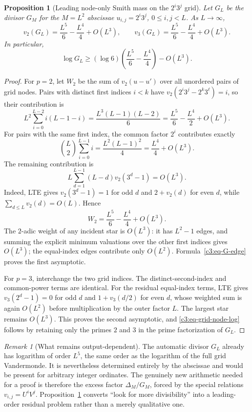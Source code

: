 \documentclass[11pt,oneside]{article}
\newtheorem{proposition}[theorem]{Proposition}
\theoremstyle{definition}
\theoremstyle{remark}
\newtheorem{remark}[theorem]{Remark}
\begin{document}
\begin{proposition}[Leading node-only Smith mass on the $2^i3^j$ grid]
\label{c3:prop-grid-node-mass}
Let $G_L$ be the divisor $G_M$ for the $M=L^2$ abscissae
$u_{i,j}=2^i3^j$, $0\le i,j<L$.  As $L\to\infty$,
\begin{equation}
 v_2(G_L)=\frac{L^5}{6}-\frac{L^4}{4}+O(L^3),
 \qquad
 v_3(G_L)=\frac{L^5}{6}-\frac{L^4}{4}+O(L^3).
 \label{c3:eq-grid-node-mass}
\end{equation}
In particular,
\begin{equation}
 \log G_L\ge
 (\log6)\left(\frac{L^5}{6}-\frac{L^4}{4}\right)-O(L^3).
 \label{c3:eq-grid-node-log}
\end{equation}
\end{proposition}

\begin{proof}
For $p=2$, let $W_2$ be the sum of $v_2(u-u')$ over all unordered pairs of grid nodes.
Pairs with distinct first indices $i<k$ have
$v_2(2^i3^j-2^k3^\ell)=i$, so their contribution is
\[
 L^2\sum_{i=0}^{L-2}i(L-1-i)
 =\frac{L^3(L-1)(L-2)}6
 =\frac{L^5}{6}-\frac{L^4}{2}+O(L^3).
\]
For pairs with the same first index, the common factor $2^i$ contributes exactly
\[
 \binom L2\sum_{i=0}^{L-1}i
 =\frac{L^2(L-1)^2}{4}
 =\frac{L^4}{4}+O(L^3).
\]
The remaining contribution is
\[
 L\sum_{d=1}^{L-1}(L-d)v_2(3^d-1)=O(L^3).
\]
Indeed, LTE gives $v_2(3^d-1)=1$ for odd $d$ and
$2+v_2(d)$ for even $d$, while
$\sum_{d\le L}v_2(d)=O(L)$.  Hence
\[
 W_2=\frac{L^5}{6}-\frac{L^4}{4}+O(L^3).
\]
The $2$-adic weight of any incident star is $O(L^3)$: it has $L^2-1$ edges, and summing the
explicit minimum valuations over the other first indices gives $O(L^3)$; the equal-index
edges contribute only $O(L^2)$.  Formula~\eqref{c3:eq-G-edge} proves the first asymptotic.

For $p=3$, interchange the two grid indices.  The distinct-second-index and common-power
terms are identical.  For the residual equal-index terms, LTE gives
$v_3(2^d-1)=0$ for odd $d$ and $1+v_3(d/2)$ for even $d$, whose weighted sum is again
$O(L^2)$ before multiplication by the outer factor $L$.  The largest star remains $O(L^3)$.
This proves the second asymptotic, and \eqref{c3:eq-grid-node-log} follows by retaining only
the primes $2$ and $3$ in the prime factorization of $G_L$.
\end{proof}

\begin{remark}[What remains output-dependent]
The automatic divisor $G_L$ already has logarithm of order $L^5$, the same order as the
logarithm of the full grid Vandermonde.  It is nevertheless determined entirely by the
abscissae and would be present for arbitrary integer ordinates.  The genuinely new arithmetic
needed for a proof is therefore the excess factor $\Delta_M/G_M$, forced by the special
relations $v_{i,j}=U^iV^j$.  Proposition~\ref{c3:prop-grid-node-mass} converts ``look for
more divisibility'' into a leading-order residual problem rather than a merely qualitative
one.
\end{remark}
\end{document}
